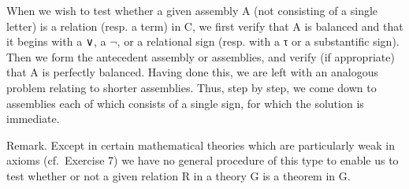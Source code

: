 When we wish to test whether a given assembly A (not consisting of a single letter) is a relation (resp. a term) in C, we first verify that A is balanced and that it begins with a ∨, a \(\neg\), or a relational sign (resp. with a τ or a substantific sign). Then we form the antecedent assembly or assemblies, and verify (if appropriate) that A is perfectly balanced. Having done this, we are left with an analogous problem relating to shorter assemblies. Thus, step by step, we come down to assemblies each of which consists of a single sign, for which the solution is immediate.

Remark. Except in certain mathematical theories which are particularly weak in axioms (cf.~Exercise 7) we have no general procedure of this type to enable us to test whether or not a given relation R in a theory G is a theorem in G.

